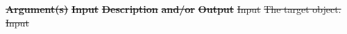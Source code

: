 \documentclass[12pt]{report} %
\providecommand{\DIFdeltex}[1]{{\protect\color{red}\sout{#1}}}                      %
\providecommand{\DIFdelend}{} %
\providecommand{\DIFdel}[1]{\texorpdfstring{\DIFdeltex{#1}}{}} %
\DeclareRobustCommand{\DIFdelend}{\DIFOaddend \let\includegraphics\DIFOincludegraphics} %
\begin{document}
\textbf{\DIFdel{Argument(s)}} %
\textbf{\DIFdel{Input }} %
\textbf{\DIFdel{Description}} %
\textbf{\DIFdel{and/or}} %
\textbf{\DIFdel{Output}} %
\DIFdel{Input  }%
\DIFdel{The target object.}%
\DIFdel{Input  }%
\DIFdelend %
\end{document}
